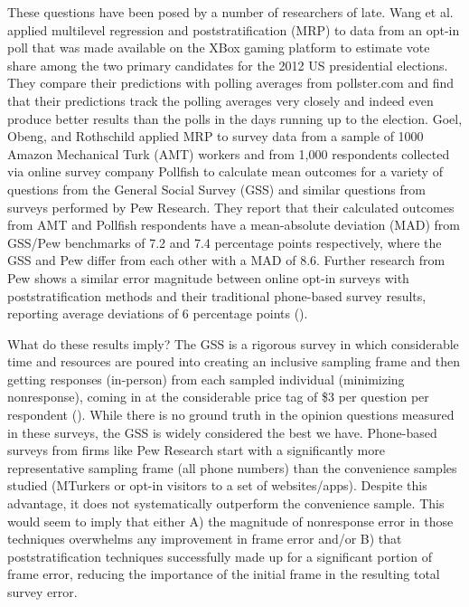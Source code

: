 \documentclass[a4paper,12pt]{article}
\theoremstyle{proposition}
\begin{document}
These questions have been posed by a number of researchers of late. Wang et al. \parencite*{Wang2015} applied multilevel regression and poststratification (MRP) to data from an opt-in poll that was made available on the XBox gaming platform to estimate vote share among the two primary candidates for the 2012 US presidential elections. They compare their predictions with polling averages from pollster.com and find that their predictions track the polling averages very closely and indeed even produce better results than the polls in the days running up to the election. Goel, Obeng, and Rothschild \parencite*{Goel2015} applied MRP to survey data from a sample of 1000 Amazon Mechanical Turk (AMT) workers and from 1,000 respondents collected via online survey company Pollfish to calculate mean outcomes for a variety of questions from the General Social Survey (GSS) and similar questions from surveys performed by Pew Research. They report that their calculated outcomes from AMT and Pollfish respondents have a mean-absolute deviation (MAD) from GSS/Pew benchmarks of 7.2 and 7.4 percentage points respectively, where the GSS and Pew differ from each other with a MAD of 8.6. Further research from Pew shows a similar error magnitude between online opt-in surveys with poststratification methods and their traditional phone-based survey results, reporting average deviations of 6 percentage points (\cite{Mercer2018}).

What do these results imply? The GSS is a rigorous survey in which considerable time and resources are poured into creating an inclusive sampling frame and then getting responses (in-person) from each sampled individual (minimizing nonresponse), coming in at the considerable price tag of \$3 per question per respondent (\cite{Goel2015}). While there is no ground truth in the opinion questions measured in these surveys, the GSS is widely considered the best we have. Phone-based surveys from firms like Pew Research start with a significantly more representative sampling frame (all phone numbers) than the convenience samples studied (MTurkers or opt-in visitors to a set of websites/apps). Despite this advantage, it does not systematically outperform the convenience sample. This would seem to imply that either A) the magnitude of nonresponse error in those techniques overwhelms any improvement in frame error and/or B) that poststratification techniques successfully made up for a significant portion of frame error, reducing the importance of the initial frame in the resulting total survey error.
\end{document}
